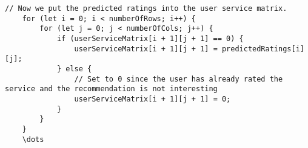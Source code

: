 \begin{lstlisting}[caption={}, captionpos=b, label={}]
    // Now we put the predicted ratings into the user service matrix.
    for (let i = 0; i < numberOfRows; i++) {
        for (let j = 0; j < numberOfCols; j++) {
            if (userServiceMatrix[i + 1][j + 1] == 0) {
                userServiceMatrix[i + 1][j + 1] = predictedRatings[i][j];
            } else {
                // Set to 0 since the user has already rated the service and the recommendation is not interesting
                userServiceMatrix[i + 1][j + 1] = 0;
            }
        }
    }
    \dots
\end{lstlisting}